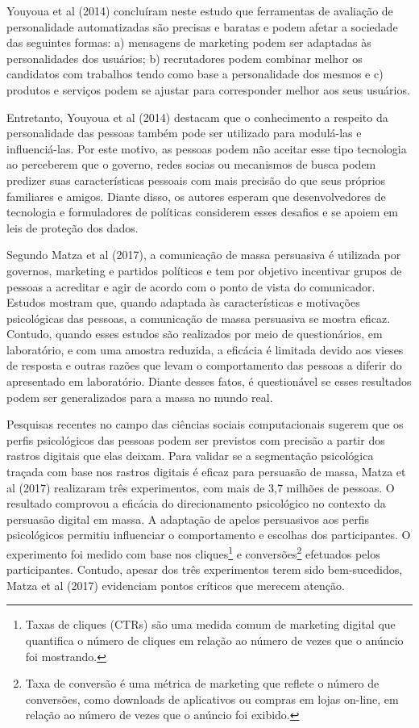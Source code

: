 Youyoua et al (2014) concluíram neste estudo que ferramentas de
avaliação de personalidade automatizadas são precisas e baratas e podem
afetar a sociedade das seguintes formas: a) mensagens de marketing podem
ser adaptadas às personalidades dos usuários; b) recrutadores podem
combinar melhor os candidatos com trabalhos tendo como base a
personalidade dos mesmos e c) produtos e serviços podem se ajustar para
corresponder melhor aos seus usuários.

Entretanto, Youyoua et al (2014) destacam que o conhecimento a respeito
da personalidade das pessoas também pode ser utilizado para modulá-las e
influenciá-las. Por este motivo, as pessoas podem não aceitar esse tipo
tecnologia ao perceberem que o governo, redes socias ou mecanismos de
busca podem predizer suas características pessoais com mais precisão do
que seus próprios familiares e amigos. Diante disso, os autores esperam
que desenvolvedores de tecnologia e formuladores de políticas considerem
esses desafios e se apoiem em leis de proteção dos dados.

Segundo Matza et al (2017), a comunicação de massa persuasiva é
utilizada por governos, marketing e partidos políticos e tem por
objetivo incentivar grupos de pessoas a acreditar e agir de acordo com o
ponto de vista do comunicador. Estudos mostram que, quando adaptada às
características e motivações psicológicas das pessoas, a comunicação de
massa persuasiva se mostra eficaz. Contudo, quando esses estudos são
realizados por meio de questionários, em laboratório, e com uma amostra
reduzida, a eficácia é limitada devido aos vieses de resposta e outras
razões que levam o comportamento das pessoas a diferir do apresentado em
laboratório. Diante desses fatos, é questionável se esses resultados
podem ser generalizados para a massa no mundo real.

Pesquisas recentes no campo das ciências sociais computacionais sugerem
que os perfis psicológicos das pessoas podem ser previstos com precisão
a partir dos rastros digitais que elas deixam. Para validar se a
segmentação psicológica traçada com base nos rastros digitais é eficaz
para persuasão de massa, Matza et al (2017) realizaram três
experimentos, com mais de 3,7 milhões de pessoas. O resultado comprovou
a eficácia do direcionamento psicológico no contexto da persuasão
digital em massa. A adaptação de apelos persuasivos aos perfis
psicológicos permitiu influenciar o comportamento e escolhas dos
participantes. O experimento foi medido com base nos cliques\footnote{Taxas
  de cliques (CTRs) são uma medida comum de marketing digital que
  quantifica o número de cliques em relação ao número de vezes que o
  anúncio foi mostrando.} e conversões\footnote{Taxa de conversão é uma
  métrica de marketing que reflete o número de conversões, como
  downloads de aplicativos ou compras em lojas on-line, em relação ao
  número de vezes que o anúncio foi exibido.} efetuados pelos
participantes. Contudo, apesar dos três experimentos terem sido
bem-sucedidos, Matza et al (2017) evidenciam pontos críticos que merecem
atenção.

